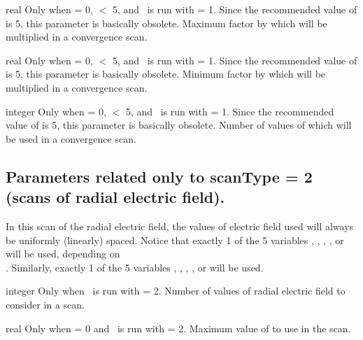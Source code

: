 \myhrule

{real}
{Only when  = 0,  $<$ 5, and \sfincsScan~is run with  = 1.
Since the recommended value of  is 5, this parameter is basically obsolete.}
{Maximum factor by which  will be multiplied in a convergence scan.}

\myhrule

{real}
{Only when  = 0,  $<$ 5, and \sfincsScan~is run with  = 1.
Since the recommended value of  is 5, this parameter is basically obsolete.}
{Minimum factor by which  will be multiplied in a convergence scan.}

\myhrule

{integer}
{Only when  = 0,  $<$ 5, and \sfincsScan~is run with  = 1.
Since the recommended value of  is 5, this parameter is basically obsolete.}
{Number of values of  which will be used in a convergence scan.}




\subsection{Parameters related only to {\ttfamily scanType} = 2 (scans of radial electric field).}

In this scan of the radial electric field, the values of electric field used
will always be uniformly (linearly) spaced.  
Notice that exactly 1 of the 5 variables , , , , or 
will be used, depending on\\
.
Similarly, exactly 1 of the 5 variables
, , , , or 
will be used.

\myhrule

{integer}
{Only when \sfincsScan~is run with  = 2.}
{Number of values of radial electric field to consider in a scan.}

\myhrule

{real}
{Only when  = 0 and \sfincsScan~is run with  = 2.}
{Maximum value of  to use in the scan.}

